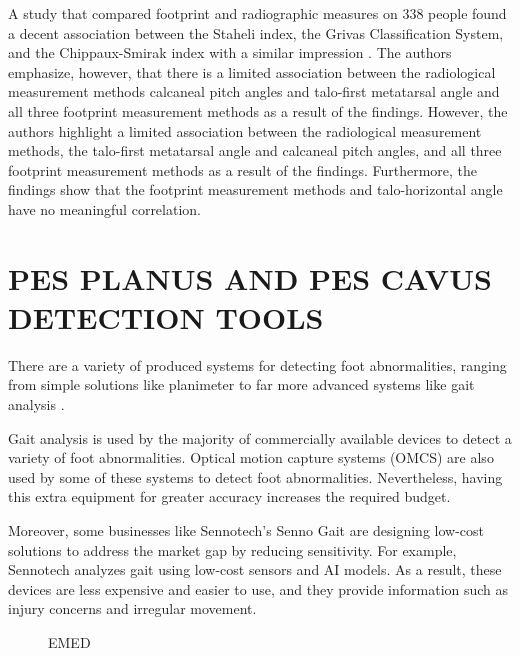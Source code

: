 A study that compared footprint and radiographic measures on 338 people found a decent association between the Staheli index, the Grivas Classification System, and the Chippaux-Smirak index with a similar impression \cite{gun2012correlation}. The authors emphasize, however, that there is a limited association between the radiological measurement methods calcaneal pitch angles and talo-first metatarsal angle and all three footprint measurement methods as a result of the findings. However, the authors highlight a limited association between the radiological measurement methods, the talo-first metatarsal angle and calcaneal pitch angles, and all three footprint measurement methods as a result of the findings. Furthermore, the findings show that the footprint measurement methods and talo-horizontal angle have no meaningful correlation.

\section{PES PLANUS AND PES CAVUS DETECTION TOOLS}

There are a variety of produced systems for detecting foot abnormalities, ranging from simple solutions like planimeter \cite{Didia1987TheUO} to far more advanced systems like gait analysis \cite{Buldt2015FootPI}.

Gait analysis \cite{sennotech_2021,alfoots_2021} is used by the majority of commercially available devices to detect a variety of foot abnormalities. Optical motion capture systems (OMCS) \cite{vicon_2021} are also used by some of these systems to detect foot abnormalities. Nevertheless, having this extra equipment for greater accuracy increases the required budget.

Moreover, some businesses like Sennotech's Senno Gait are designing low-cost solutions to address the market gap by reducing sensitivity. For example, Sennotech \cite{sennotech_2021} analyzes gait using low-cost sensors and AI models. As a result, these devices are less expensive and easier to use, and they provide information such as injury concerns and irregular movement.

\begin{figure}[htbp]
\centering
{}
\caption{EMED \cite{articleFootPressure}}
\label{fig:BackgroundExampleEmed}
\end{figure}

